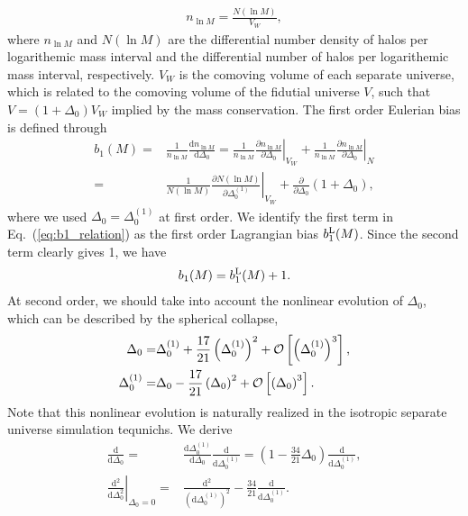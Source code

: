 \documentclass[a4paper,11pt]{article}
\renewcommand{\d}{\mathrm{d}}
\begin{document}
\begin{align}
n_{\ln{M}} = \frac{N(\ln{M})}{V_W},
\end{align}
where $n_{\ln{M}}$ and $N(\ln{M})$ are the differential number density of halos per logarithemic mass interval and 
the differential number of halos per logarithemic mass interval, respectively.
$V_W$ is the comoving volume of each separate universe, which is related to the comoving volume of the  fidutial universe $V$, such that $V = (1+\Delta_0) V_W$ implied by the mass conservation.
The first order Eulerian bias is defined through
\begin{align}
b_{1}(M) =& \frac{1}{n_{\ln{M}}}
\frac{\d n_{\ln{M}}}{\d \Delta_0}
=\frac{1}{n_{\ln{M}}} \left.\frac{\partial n_{\ln{M}}}{\partial\Delta_0}\right|_{V_W}
+ \frac{1}{n_{\ln{M}}}\left.\frac{\partial n_{\ln{M}}}{\partial \Delta_0}\right|_{N}
\\
=& \frac{1}{N(\ln{M})}
\left.\frac{\partial N(\ln{M})}{\partial \Delta^{(1)}_0}\right|_{V_W}
+\frac{\partial}{\partial \Delta_0}\left(1+\Delta_0\right),
\label{eq:b1_relation}
\end{align}
where we used $\Delta_0 = \Delta_0^{(1)}$ at first order.
We identify the first term in Eq.~(\ref{eq:b1_relation}) as 
the first order Lagrangian bias $b_1^{\rm L}(M)$. 
Since the second term clearly gives 1, we have
\begin{align}
b_1(M) = b_1^{\rm L}(M) + 1.
\end{align}
At second order, we should take into account 
the nonlinear evolution of $\Delta_0$,
which can be described by the spherical collapse,
\begin{align}
\Delta_0 =& \Delta_0^{(1)} + \frac{17}{21}\left(\Delta_0^{(1)}\right)^2 + {\cal O}\left[
\left(\Delta^{(1)}_0\right)^3\right],
\\
\Delta_0^{(1)} =& \Delta_0 - \frac{17}{21}\left(\Delta_0\right)^2 
+ {\cal O}\left[ \left(\Delta_0\right)^3\right].
\end{align}
Note that this nonlinear evolution is naturally realized in the isotropic separate universe simulation tequnichs.
We derive 
\begin{align}
\frac{\d}{\d \Delta_0} 
=&
\frac{\d \Delta_0^{(1)} }{\d \Delta_0}\frac{\d }{\d \Delta_0^{(1)}}
=\left( 1 - \frac{34}{21}\Delta_0 \right)\frac{\d }{\d \Delta_0^{(1)}},
\\
\left. \frac{\d^2}{\d \Delta_0^2}\right|_{\Delta_0=0}
=& \frac{\d^2}{\left(\d \Delta_0^{(1)}\right)^2}
-\frac{34}{21}\frac{\d }{\d \Delta_0^{(1)}}.
\end{align}
\end{document}
